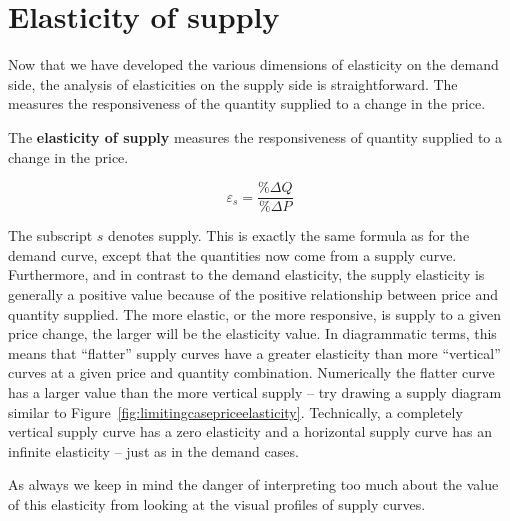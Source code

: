\section{Elasticity of supply}\label{sec:ch4sec6}

Now that we have developed the various dimensions of elasticity on the demand side, the analysis of elasticities on the supply side is straightforward. The  measures the responsiveness of the quantity supplied to a change in the price.

\begin{DefBox}
The \textbf{elasticity of supply} measures the responsiveness of quantity supplied to a change in the price.
\end{DefBox}

\begin{equation*}
\varepsilon_s=\frac{\%\Delta Q}{\%\Delta P}
\end{equation*}

The subscript $s$ denotes supply. This is exactly the same formula as for the demand curve, except that the quantities now come from a supply curve. Furthermore, and in contrast to the demand elasticity, the supply elasticity is generally a positive value because of the positive relationship between price and quantity supplied. The more elastic, or the more responsive, is supply to a given price change, the larger will be the elasticity value. In diagrammatic terms, this means that ``flatter'' supply curves have a greater elasticity than more ``vertical'' curves at a given price and quantity combination. Numerically the flatter curve has a larger value than the more vertical supply -- try drawing a supply diagram similar to Figure~\ref{fig:limitingcasepriceelasticity}. Technically, a completely vertical supply curve has a zero elasticity and a horizontal supply curve has an infinite elasticity -- just as in the demand cases. 

As always we keep in mind the danger of interpreting too much about the value of this elasticity from looking at the visual profiles of supply curves.